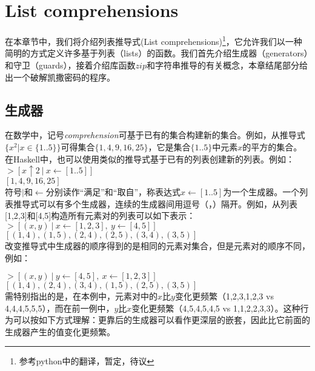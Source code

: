 \chapter{List comprehensions}

在本章节中，我们将介绍列表推导式(List comprehensions)\footnote{参考python中的翻译，暂定，待议}，它允许我们以一种简明的方式定义许多基于列表（lists）的函数。我们首先介绍生成器（generators）和守卫（guards），接着介绍库函数$zip$和字符串推导的有关概念，本章结尾部分给出一个破解凯撒密码的程序。
\section{生成器}
在数学中，记号\textit{comprehension}可基于已有的集合构建新的集合。例如，从推导式$\{x^2 | x \in \{1..5\}\}$可得集合$\{1,4,9,16,25\}$，它是集合$\{1..5\}$中元素$x$的平方的集合。在Haskell中，也可以使用类似的推导式基于已有的列表创建新的列表。例如：\\

\noindent\hspace*{1cm}$>[x \uparrow 2~|~x \leftarrow [1..5]]$\\
\hspace*{1cm}$[1,4,9,16,25]$\\

\noindent 符号$|$和$\leftarrow$分别读作“满足”和“取自”，称表达式$x\leftarrow[1..5]$为一个生成器。一个列表推导式可以有多个生成器，连续的生成器间用逗号（，）隔开。例如，从列表[1,2,3]和[4,5]构造所有元素对的列表可以如下表示：\\

\noindent\hspace*{1cm}$> [(x,y)~|~x\leftarrow [1,2,3],~y\leftarrow [4,5]]$\\
\hspace*{1cm}$[(1,4),(1,5),(2,4),(2,5),(3,4),(3,5)]$\\

改变推导式中生成器的顺序得到的是相同的元素对集合，但是元素对的顺序不同，例如：

\noindent\hspace*{1cm}$> [(x,y)~|~y\leftarrow [4,5],~x\leftarrow [1,2,3]]$\\
\hspace*{1cm}$[(1,4),(2,4),(3,4),(1,5),(2,5),(3,5)]$\\

需特别指出的是，在本例中，元素对中的$x$比$y$变化更频繁（1,2,3,1,2,3 vs 4,4,4,5,5,5），而在前一例中，$y$比$x$变化更频繁（4,5,4,5,4,5 vs 1,1,2,2,3,3）。这种行为可以按如下方式理解：更靠后的生成器可以看作更深层的嵌套，因此比它前面的生成器产生的值变化更频繁。

